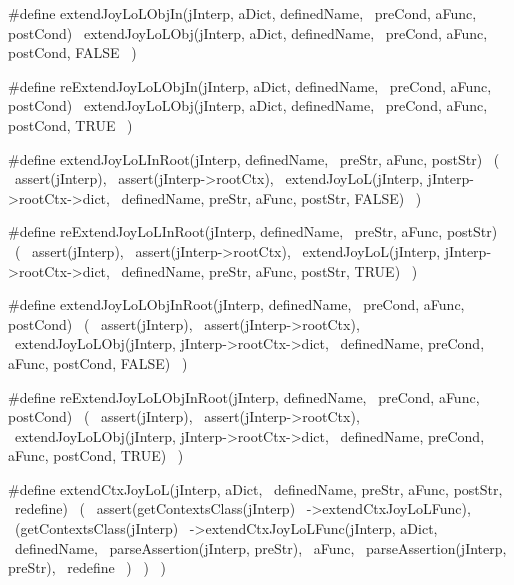 #define extendJoyLoLObjIn(jInterp, aDict, definedName,  \
  preCond, aFunc, postCond)                              \
  extendJoyLoLObj(jInterp, aDict, definedName,          \
    preCond, aFunc, postCond, FALSE                     \
  )
  
#define reExtendJoyLoLObjIn(jInterp, aDict, definedName,  \
  preCond, aFunc, postCond)                               \
  extendJoyLoLObj(jInterp, aDict, definedName,            \
    preCond, aFunc, postCond, TRUE                        \
  )
  
#define extendJoyLoLInRoot(jInterp, definedName,  \
  preStr, aFunc, postStr)                         \
  (                                               \
    assert(jInterp),                              \
    assert(jInterp->rootCtx),                     \
    extendJoyLoL(jInterp, jInterp->rootCtx->dict, \
      definedName, preStr, aFunc, postStr, FALSE) \
  )
  
#define reExtendJoyLoLInRoot(jInterp, definedName,  \
  preStr, aFunc, postStr)                           \
  (                                                 \
    assert(jInterp),                                \
    assert(jInterp->rootCtx),                       \
    extendJoyLoL(jInterp, jInterp->rootCtx->dict,   \
      definedName, preStr, aFunc, postStr, TRUE)    \
  )

#define extendJoyLoLObjInRoot(jInterp, definedName,   \
  preCond, aFunc, postCond)                           \
  (                                                   \
    assert(jInterp),                                  \
    assert(jInterp->rootCtx),                         \
    extendJoyLoLObj(jInterp, jInterp->rootCtx->dict,  \
      definedName, preCond, aFunc, postCond, FALSE)   \
  )
  
#define reExtendJoyLoLObjInRoot(jInterp, definedName, \
  preCond, aFunc, postCond)                           \
  (                                                   \
    assert(jInterp),                                  \
    assert(jInterp->rootCtx),                         \
    extendJoyLoLObj(jInterp, jInterp->rootCtx->dict,  \
      definedName, preCond, aFunc, postCond, TRUE)    \
  )

#define extendCtxJoyLoL(jInterp, aDict,     \
  definedName, preStr, aFunc, postStr,      \
  redefine)                                 \
  (                                         \
    assert(getContextsClass(jInterp)        \
      ->extendCtxJoyLoLFunc),               \
    (getContextsClass(jInterp)              \
      ->extendCtxJoyLoLFunc(jInterp, aDict, \
        definedName,                        \
        parseAssertion(jInterp, preStr),    \
        aFunc,                              \
        parseAssertion(jInterp, preStr),    \
        redefine                            \
      )                                     \
    )                                       \
  )
  
